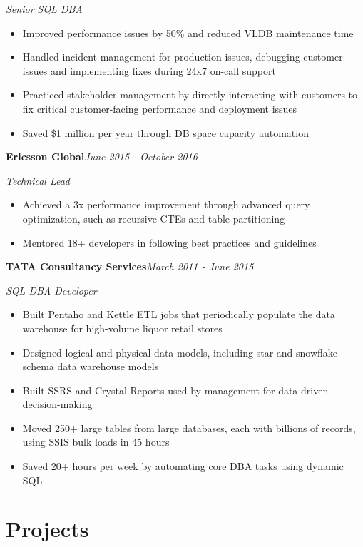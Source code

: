 \documentclass[10pt,a4paper]{article}
\begin{document}
\textit{Senior SQL DBA}\\[-5pt]
\begin{itemize}
  \item Improved performance issues by 50\% and reduced VLDB maintenance time
  \item Handled incident management for production issues, debugging customer issues and implementing fixes during 24x7 on-call support
  \item Practiced stakeholder management by directly interacting with customers to fix critical customer-facing performance and deployment issues
  \item Saved \$1 million per year through DB space capacity automation
\end{itemize}
\vspace{14.7pt}
\noindent\textbf{Ericsson Global}\hfill \textit{June 2015 - October 2016}

\textit{Technical Lead}\\[-5pt]
\begin{itemize}
  \item Achieved a 3x performance improvement through advanced query optimization, such as recursive CTEs and table partitioning
  \item Mentored 18+ developers in following best practices and guidelines
\end{itemize}
\vspace{14.7pt}
\noindent\textbf{TATA Consultancy Services}\hfill \textit{March 2011 - June 2015}

\textit{SQL DBA Developer}\\[-5pt]
\begin{itemize}
  \item Built Pentaho and Kettle ETL jobs that periodically populate the data warehouse for high-volume liquor retail stores
  \item Designed logical and physical data models, including star and snowflake schema data warehouse models
  \item Built SSRS and Crystal Reports used by management for data-driven decision-making
  \item Moved 250+ large tables from large databases, each with billions of records, using SSIS bulk loads in 45 hours
  \item Saved 20+ hours per week by automating core DBA tasks using dynamic SQL
\end{itemize}

\section{Projects}
\end{document}
